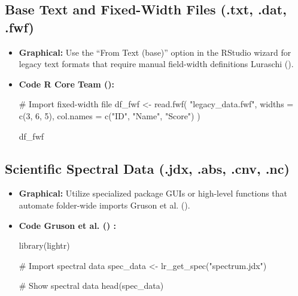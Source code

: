 \documentclass[
  doc,
  longtable,
  a4paper,
  nolmodern,
  notxfonts,
  notimes,
  colorlinks=true,linkcolor=blue,citecolor=blue,urlcolor=blue]{apa7}
\newenvironment{Shaded}{\begin{snugshade}}{\end{snugshade}}
\newcommand{\AttributeTok}[1]{\textcolor[rgb]{0.40,0.45,0.13}{#1}}
\newcommand{\CommentTok}[1]{\textcolor[rgb]{0.37,0.37,0.37}{#1}}
\newcommand{\DecValTok}[1]{\textcolor[rgb]{0.68,0.00,0.00}{#1}}
\newcommand{\FunctionTok}[1]{\textcolor[rgb]{0.28,0.35,0.67}{#1}}
\newcommand{\NormalTok}[1]{\textcolor[rgb]{0.00,0.23,0.31}{#1}}
\newcommand{\OtherTok}[1]{\textcolor[rgb]{0.00,0.23,0.31}{#1}}
\newcommand{\StringTok}[1]{\textcolor[rgb]{0.13,0.47,0.30}{#1}}
\begin{document}
\subsection{Base Text and Fixed-Width Files (.txt, .dat,
.fwf)}\label{base-text-and-fixed-width-files-.txt-.dat-.fwf}

\begin{itemize}
\item
  \textbf{Graphical:} Use the ``From Text (base)'' option in the RStudio
  wizard for legacy text formats that require manual field-width
  definitions Luraschi ().
\item
  \textbf{Code R Core Team ():}

\begin{Shaded}
\begin{Highlighting}[]
\CommentTok{\# Import fixed{-}width file}
\NormalTok{df\_fwf }\OtherTok{\textless{}{-}} \FunctionTok{read.fwf}\NormalTok{(}
  \StringTok{"legacy\_data.fwf"}\NormalTok{,}
  \AttributeTok{widths =} \FunctionTok{c}\NormalTok{(}\DecValTok{3}\NormalTok{, }\DecValTok{6}\NormalTok{, }\DecValTok{5}\NormalTok{),}
  \AttributeTok{col.names =} \FunctionTok{c}\NormalTok{(}\StringTok{"ID"}\NormalTok{, }\StringTok{"Name"}\NormalTok{, }\StringTok{"Score"}\NormalTok{)}
\NormalTok{)}

\NormalTok{df\_fwf}
\end{Highlighting}
\end{Shaded}
\end{itemize}

\subsection{Scientific Spectral Data (.jdx, .abs, .cnv,
.nc)}\label{scientific-spectral-data-.jdx-.abs-.cnv-.nc}

\begin{itemize}
\item
  \textbf{Graphical:} Utilize specialized package GUIs or high-level
  functions that automate folder-wide imports Gruson et al.
  ().
\item
  \textbf{Code Gruson et al. () :}

\begin{Shaded}
\begin{Highlighting}[]
\FunctionTok{library}\NormalTok{(lightr)}

\CommentTok{\# Import spectral data}
\NormalTok{spec\_data }\OtherTok{\textless{}{-}} \FunctionTok{lr\_get\_spec}\NormalTok{(}\StringTok{"spectrum.jdx"}\NormalTok{)}

\CommentTok{\# Show spectral data}
\FunctionTok{head}\NormalTok{(spec\_data)}
\end{Highlighting}
\end{Shaded}
\end{itemize}
\end{document}
